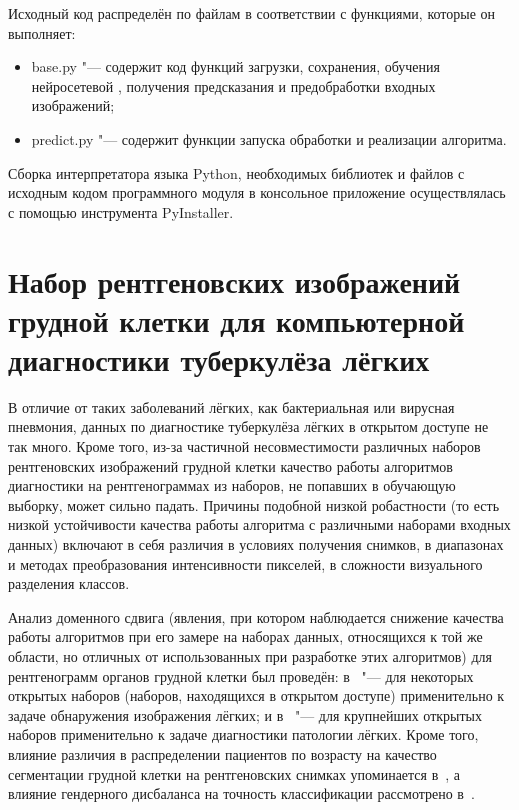 Исходный код распределён по файлам в соответствии с функциями, которые он выполняет:

\begin{itemize}[beginpenalty=10000]
	\item base.py "--- содержит код функций загрузки, сохранения, обучения нейросетевой , получения предсказания и предобработки входных изображений;
	\item predict.py "--- содержит функции запуска обработки и реализации алгоритма.
\end{itemize}

Сборка интерпретатора языка Python, необходимых библиотек и файлов с исходным кодом программного модуля в консольное приложение осуществлялась с помощью инструмента PyInstaller.

\section{Набор рентгеновских изображений грудной клетки для компьютерной диагностики туберкулёза лёгких} \label{sec:sakha-tb}

В отличие от таких заболеваний лёгких, как бактериальная или вирусная пневмония, данных по диагностике туберкулёза лёгких в открытом доступе не так много. Кроме того, из-за частичной несовместимости различных наборов рентгеновских изображений грудной клетки качество работы алгоритмов диагностики на рентгенограммах из наборов, не попавших в обучающую выборку, может сильно падать. Причины подобной низкой робастности (то есть низкой устойчивости качества работы алгоритма с различными наборами входных данных) включают в себя различия в условиях получения снимков, в диапазонах и методах преобразования интенсивности пикселей, в сложности визуального разделения классов.

Анализ доменного сдвига (явления, при котором наблюдается снижение качества работы алгоритмов при его замере на наборах данных, относящихся к той же области, но отличных от использованных при разработке этих алгоритмов) для рентгенограмм органов грудной клетки был проведён: в~\cite{xue2023cross} "--- для некоторых открытых наборов (наборов, находящихся в открытом доступе) применительно к задаче обнаружения изображения лёгких; и в~\cite{pooch2020can} "--- для крупнейших открытых наборов применительно к задаче диагностики патологии лёгких. Кроме того, влияние различия в распределении пациентов по возрасту на качество сегментации грудной клетки на рентгеновских снимках упоминается в~\cite{gaggion2022improving}, а влияние гендерного дисбаланса на точность классификации рассмотрено в~\cite{larrazabal2020gender}.

